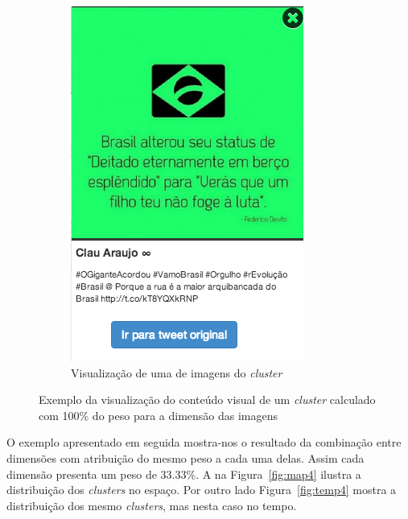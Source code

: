 \begin{figure}[h]
\begin{subfigure}[b]{0.32\textwidth}
	\includegraphics[width=0.85\linewidth]{./figures/olhopassarinho/c2_ex3_im100_1718}
	\caption{ Visualização de uma de imagens do \textit{cluster} }
	\label{subfig:im03}
	\end{subfigure}
\caption{Exemplo da visualização do conteúdo visual de um \textit{cluster} calculado com 100\% do peso para a dimensão das imagens}
\label{fig:im00}
\end{figure}


O exemplo apresentado em seguida mostra-nos o resultado da combinação entre dimensões com atribuição do mesmo peso a cada uma delas. Assim cada dimensão presenta um peso de 33.33\%. A na Figura~\ref{fig:map4} ilustra a distribuição dos \textit{clusters} no espaço. Por outro lado Figura~\ref{fig:temp4} mostra a distribuição dos mesmo \textit{clusters}, mas nesta caso no tempo.
\vspace{2mm}

